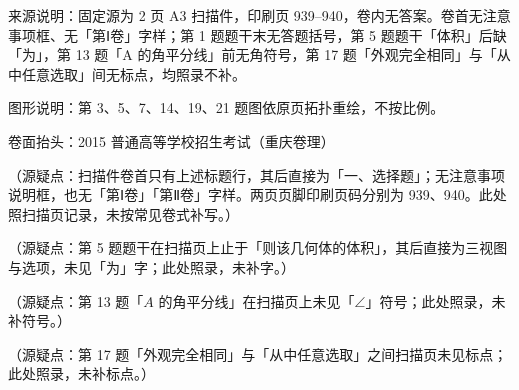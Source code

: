 

\begin{gktip}
来源说明：固定源为 2 页 A3 扫描件，印刷页 939–940，卷内无答案。卷首无注意事项框、无「第Ⅰ卷」字样；第 1 题题干末无答题括号，第 5 题题干「体积」后缺「为」，第 13 题「A 的角平分线」前无角符号，第 17 题「外观完全相同」与「从中任意选取」间无标点，均照录不补。

图形说明：第 3、5、7、14、19、21 题图依原页拓扑重绘，不按比例。
\end{gktip}

\begin{gktip}
卷面抬头：2015 普通高等学校招生考试（重庆卷理）

（源疑点：扫描件卷首只有上述标题行，其后直接为「一、选择题」；无注意事项说明框，也无「第Ⅰ卷」「第Ⅱ卷」字样。两页页脚印刷页码分别为 939、940。此处照扫描页记录，未按常见卷式补写。）

（源疑点：第 5 题题干在扫描页上止于「则该几何体的体积」，其后直接为三视图与选项，未见「为」字；此处照录，未补字。）

（源疑点：第 13 题「$A$ 的角平分线」在扫描页上未见「$\angle$」符号；此处照录，未补符号。）

（源疑点：第 17 题「外观完全相同」与「从中任意选取」之间扫描页未见标点；此处照录，未补标点。）
\end{gktip}


